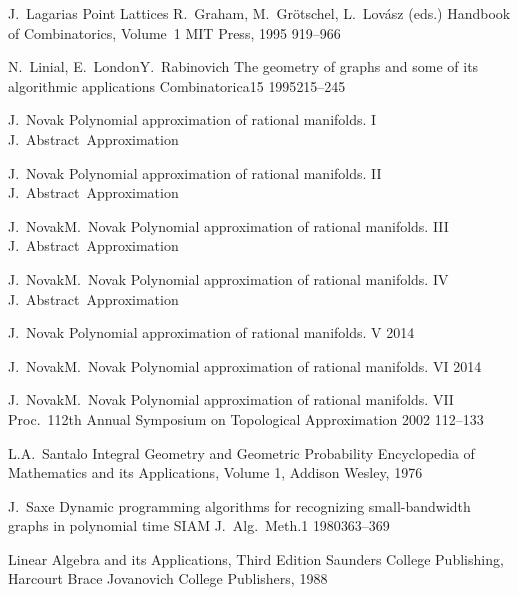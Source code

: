 \documentclass[12pt,a4paper,titlepage,openany]{report}
\begin{document}
\begin{thebibliography}{99}
\bookChapterOneAuthor
   {J.~Lagarias}
   {Point Lattices}
   {R.~Graham, M.~Gr\"otschel, L.~Lov\'asz (eds.)}
   {Handbook of Combinatorics, Volume~1}
   {MIT Press, 1995}
   {919--966}

   \articleInJournalManyAuthors
     {N.~Linial, E.~London}{Y.~Rabinovich}
   {The geometry of graphs and some of its algorithmic applications}
     {Combinatorica}{15}
     {1995}{215--245}

   \articleInJournalOneAuthorAccepted
     {J.~Novak}
   {Polynomial approximation of rational manifolds. I}
     {J.~Abstract~Approximation}

   \articleInJournalOneAuthorInPrint
     {J.~Novak}
   {Polynomial approximation of rational manifolds. II}
     {J.~Abstract~Approximation}

   \articleInJournalTwoAuthorsAccepted
     {J.~Novak}{M.~Novak}
   {Polynomial approximation of rational manifolds. III}
     {J.~Abstract~Approximation}

   \articleInJournalTwoAuthorsInPrint
     {J.~Novak}{M.~Novak}
   {Polynomial approximation of rational manifolds. IV}
     {J.~Abstract~Approximation}

   \articleInJournalOneAuthorSubmitted
     {J.~Novak}
   {Polynomial approximation of rational manifolds. V}
     {2014}

   \articleInJournalTwoAuthorsSubmitted
     {J.~Novak}{M.~Novak}
   {Polynomial approximation of rational manifolds. VI}
     {2014}

\conferenceArticleTwoAuthors
     {J.~Novak}{M.~Novak}
   {Polynomial approximation of rational manifolds. VII}
    {Proc.~112th Annual Symposium on Topological Approximation}
    {2002}
    {112--133}

  \bookOneAuthor
  {L.A.~Santalo}
   {Integral Geometry and Geometric Probability}
    {Encyclopedia of Mathematics and its Applications, Volume 1, Addison Wesley, 1976}

   \articleInJournalOneAuthor
     {J.~Saxe}
   {Dynamic programming algorithms for recognizing small-bandwidth graphs in polynomial time}
     {SIAM J.~Alg.~Meth.}{1}
     {1980}{363--369}

   {Linear Algebra and its Applications, Third Edition}
    {Saunders College \hbox{Publishing}, Harcourt Brace Jovanovich College Publishers, 1988}


\end{thebibliography}
\end{document}
